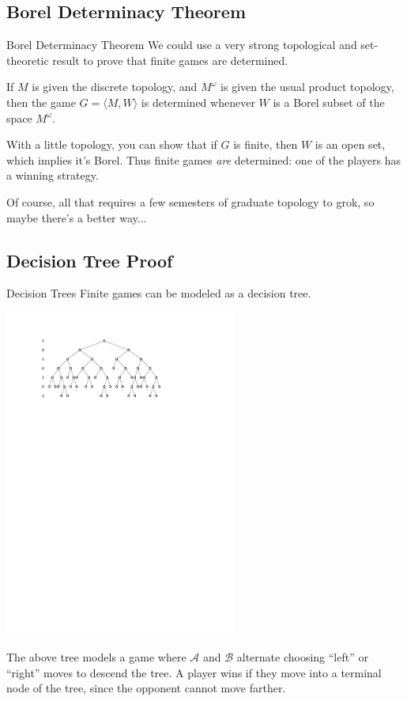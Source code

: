 \documentclass{beamer}
\theoremstyle{theorem}
\theoremstyle{definition}
\newcommand{\<}{\langle}
\renewcommand{\>}{\rangle}
\newcommand{\pl}[1]{\mathscr{#1}}
\newcommand{\vpause}{\pause\vspace{1em}}
\begin{document}
\subsection{Borel Determinacy Theorem}

\begin{frame}{Borel Determinacy Theorem}
  We could use a very strong topological and set-theoretic result to prove
  that finite games are determined.

  \begin{theorem}
    If $M$ is given the discrete topology, and $M^\omega$ is given the usual
    product topology, then the game $G=\<M,W\>$ is determined whenever $W$
    is a Borel subset of the space $M^\omega$.
  \end{theorem}

  \pause

  With a little topology, you can show that if $G$ is finite, then $W$ is
  an open set, which implies it's Borel. Thus finite games \textit{are}
  determined: one of the players has a winning strategy.

  \vpause

  Of course, all that requires a few semesters of graduate topology to grok,
  so maybe there's a better way...
\end{frame}

\subsection{Decision Tree Proof}

\begin{frame}{Decision Trees}
  Finite games can be modeled as a decision tree.

  \centerline{\includegraphics[width=3in]{decisionTree1.pdf}}

  The above tree models a game where $\pl A$ and $\pl B$ alternate choosing
  ``left'' or ``right'' moves to descend the tree. A player wins if they
  move into a terminal node of the tree, since the opponent cannot move farther.
\end{frame}
\end{document}
